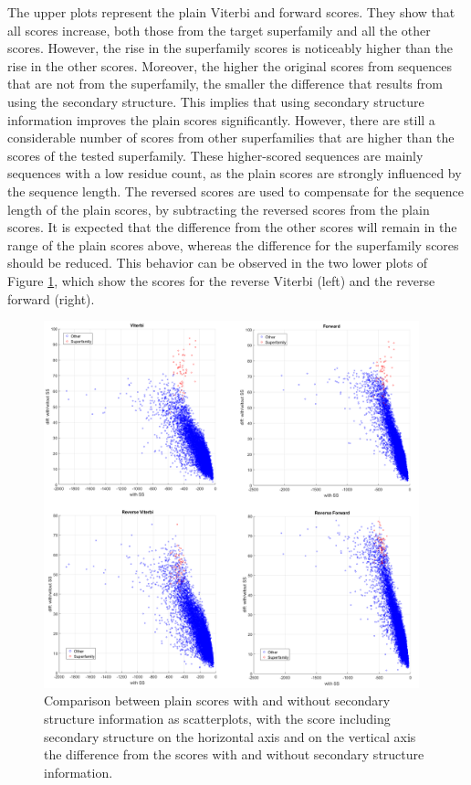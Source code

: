 The upper plots represent the plain Viterbi and forward scores. 
They show that all scores increase, both those from the target superfamily and all the other scores.
However, the rise in the superfamily scores is noticeably higher than the rise in the other scores. 
Moreover, the higher the original scores from sequences that are not from the superfamily, the smaller the difference that results from using the secondary structure. This implies that using secondary structure information improves the plain scores significantly. However, there are still a considerable number of scores from other superfamilies that are higher than the scores of the tested superfamily. These higher-scored sequences are mainly sequences with a low residue count, as the plain scores are strongly influenced by the sequence length. The reversed scores are used to compensate for the sequence length of the plain scores, by subtracting the reversed scores from the plain scores. It is expected that the difference from the other scores will remain in the range of the plain scores above, whereas the difference for the superfamily scores should be reduced. This behavior can be observed in the two lower plots of Figure \ref{fig:eval1}, which show the scores for the reverse Viterbi (left) and the reverse forward (right). 

\begin{figure}[H]	%
	\begin{center}
		\includegraphics[width=0.97\textwidth]{fig/1plainUreversed}
	\end{center}
	\caption[Comparison between plain scores with and without secondary structure information.]{Comparison between plain scores with and without secondary structure information as scatterplots, with the score including secondary structure on the horizontal axis and on the vertical axis the difference from the scores with and without secondary structure information.}
	\label{fig:eval1}
\end{figure}


